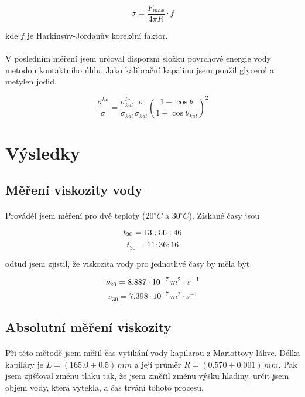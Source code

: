 \documentclass[a4paper,11pt]{article}
\begin{document}
    \begin{equation}
        \sigma = \frac{F_{max}}{4 \pi R} \cdot f
    \end{equation}

    kde $f$ je Harkinsův-Jordanův korekční faktor.

    \paragraph{} V posledním měření jsem určoval disporzní složku povrchové
    energie vody metodou kontaktního úhlu. Jako kalibrační kapalinu jsem použil 
    glycerol a metylen jodid.

    \begin{equation}
        \frac{\sigma^{lw}}{\sigma} = \frac{\sigma^{lw}_{kal}}{\sigma_{kal}}
        \frac{\sigma}{\sigma_{kal}} \left(\frac{1 + \cos \theta}{1 + \cos \theta_{kal}}\right)^{2}
    \end{equation}

\section{Výsledky}

    \subsection{Měření viskozity vody}

        \paragraph{} Prováděl jsem měření pro dvě teploty ($20 ^{\circ}C$ a $30 ^{\circ}C$). Získané časy jsou

        $$ t_{20} = 13:56:46 \\ $$
        $$ t_{30} = 11:36:16 $$

        odtud jsem zjistil, že viskozita vody pro jednotlivé časy by měla být

        $$ \nu_{20} = 8.887 \cdot 10^{-7} \, m^{2} \cdot s^{-1} \\ $$
        $$ \nu_{30} = 7.398 \cdot 10^{-7} \, m^{2} \cdot s^{-1} $$

    \subsection{Absolutní měření viskozity}

        \paragraph{} Při této mětodě jsem měřil čas vytíkání vody kapilarou z
        Mariottovy láhve. Délka kapiláry je $L = \left(165.0 \pm 0.5\right) \, mm$ a její průměr
        $R = \left(0.570 \pm 0.001\right) \, mm$. Pak jsem zjišťoval změnu tlaku tak, že jsem změřil změnu 
        výšku hladiny, určit jsem objem vody, která vytekla, a čas trvání tohoto procesu.
\end{document}
